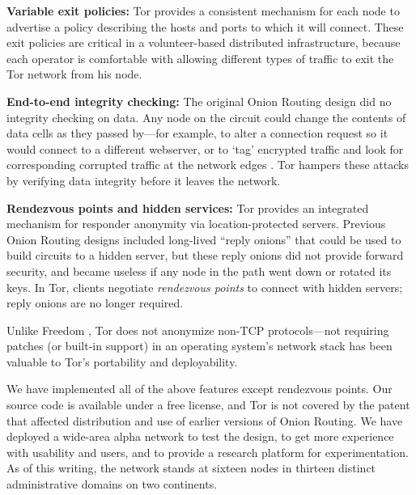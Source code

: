 \documentclass[times,10pt,twocolumn]{article}
\begin{document}
\textbf{Variable exit policies:} Tor provides a consistent mechanism
for each node to advertise a policy describing the hosts
and ports to which it will connect. These exit policies are critical
in a volunteer-based distributed infrastructure, because each operator
is comfortable with allowing different types of traffic to exit the Tor
network from his node.

\textbf{End-to-end integrity checking:} The original Onion Routing
design did no integrity checking on data. Any node on the
circuit could change the contents of data cells as they passed by---for
example, to alter a connection request so it would connect
to a different webserver, or to `tag' encrypted traffic and look for
corresponding corrupted traffic at the network edges \cite{minion-design}.
Tor hampers these attacks by verifying data integrity before it leaves
the network.


\textbf{Rendezvous points and hidden services:}
Tor provides an integrated mechanism for responder anonymity via
location-protected servers.  Previous Onion Routing designs included
long-lived ``reply onions'' that could be used to build circuits
to a hidden server, but these reply onions did not provide forward
security, and became useless if any node in the path went down
or rotated its keys.  In Tor, clients negotiate {\it rendezvous points}
to connect with hidden servers; reply onions are no longer required.


Unlike Freedom \cite{freedom2-arch}, Tor does not anonymize
non-TCP protocols---not requiring patches (or built-in support) in an
operating system's network stack has been valuable to Tor's
portability and deployability.

We have implemented all of the above features except rendezvous
points. Our source code is
available under a free license, and Tor
is not covered by the patent that affected distribution and use of
earlier versions of Onion Routing.
We have deployed a wide-area alpha network
to test the design, to get more experience with usability
and users, and to provide a research platform for experimentation.
As of this writing, the network stands at sixteen nodes in thirteen
distinct administrative domains on two continents.
\end{document}
